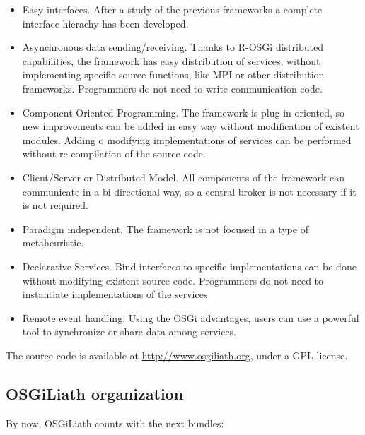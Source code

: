 \documentclass{sig-alternate}
\begin{document}
\begin{itemize}
\item Easy interfaces. After a study of the previous frameworks a complete interface hierachy has been developed.
\item Asynchronous data sending/receiving. Thanks to R-OSGi distributed capabilities, the framework has easy distribution of services, without implementing specific source functions, like MPI or other distribution frameworks. Programmers do not need to write communication code. 
\item Component Oriented Programming. The framework is plug-in oriented, so new improvements can be added in easy way without modification of existent modules. Adding o modifying implementations of services can be performed without re-compilation of the source code.
\item Client/Server or Distributed Model. All components of the framework can communicate in a bi-directional way, so a central broker is not necessary if it is not required.
\item Paradigm independent. The framework is not focused in a type of metaheuristic.
\item Declarative Services. Bind interfaces to specific implementations can be done without modifying existent source code. Programmers do not need to instantiate implementations of the services.
\item Remote event handling: Using the OSGi advantages, users can use a powerful tool to synchronize or share data among services.
\end{itemize}

The source code is available at \url{http://www.osgiliath.org}, under a GPL license.

\subsection{OSGiLiath organization}

By now, OSGiLiath counts with the next bundles:
\end{document}
